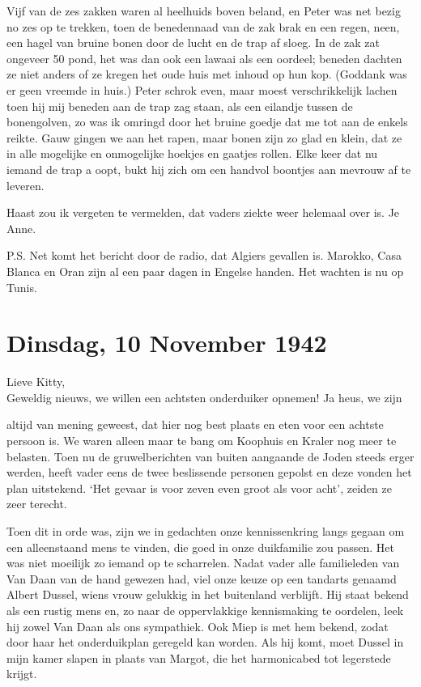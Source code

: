 \documentclass{book}
\begin{document}
Vijf van de zes zakken waren al heelhuids boven beland, en Peter was net
bezig no zes op te trekken, toen de benedennaad van de zak brak en een
regen, neen, een hagel van bruine bonen door de lucht en de trap af
sloeg. In de zak zat ongeveer 50 pond, het was dan ook een lawaai als
een oordeel; beneden dachten ze niet anders of ze kregen het oude huis
met inhoud op hun kop. (Goddank was er geen vreemde in huis.) Peter
schrok even, maar moest verschrikkelijk lachen toen hij mij beneden aan
de trap zag staan, als een eilandje tussen de bonengolven, zo was ik
omringd door het bruine goedje dat me tot aan de enkels reikte. Gauw
gingen we aan het rapen, maar bonen zijn zo glad en klein, dat ze in
alle mogelijke en onmogelijke hoekjes en gaatjes rollen. Elke keer dat
nu iemand de trap a oopt, bukt hij zich om een handvol boontjes aan
mevrouw af te leveren.

Haast zou ik vergeten te vermelden, dat vaders ziekte weer helemaal over
is. Je Anne.

P.S. Net komt het bericht door de radio, dat Algiers gevallen is.
Marokko, Casa Blanca en Oran zijn al een paar dagen in Engelse handen.
Het wachten is nu op Tunis.

\chapter{Dinsdag, 10 November 1942}

Lieve Kitty,\\Geweldig nieuws, we willen een achtsten onderduiker
opnemen! Ja heus, we zijn

altijd van mening geweest, dat hier nog best plaats en eten voor een
achtste persoon is. We waren alleen maar te bang om Koophuis en Kraler
nog meer te belasten. Toen nu de gruwelberichten van buiten aangaande de
Joden steeds erger werden, heeft vader eens de twee beslissende personen
gepolst en deze vonden het plan uitstekend. `Het gevaar is voor zeven
even groot als voor acht', zeiden ze zeer terecht.

Toen dit in orde was, zijn we in gedachten onze kennissenkring langs
gegaan om een alleenstaand mens te vinden, die goed in onze duikfamilie
zou passen. Het was niet moeilijk zo iemand op te scharrelen. Nadat
vader alle familieleden van Van Daan van de hand gewezen had, viel onze
keuze op een tandarts genaamd Albert Dussel, wiens vrouw gelukkig in het
buitenland verblijft. Hij staat bekend als een rustig mens en, zo naar
de oppervlakkige kennismaking te oordelen, leek hij zowel Van Daan als
ons sympathiek. Ook Miep is met hem bekend, zodat door haar het
onderduikplan geregeld kan worden. Als hij komt, moet Dussel in mijn
kamer slapen in plaats van Margot, die het harmonicabed tot legerstede
krijgt.
\end{document}
